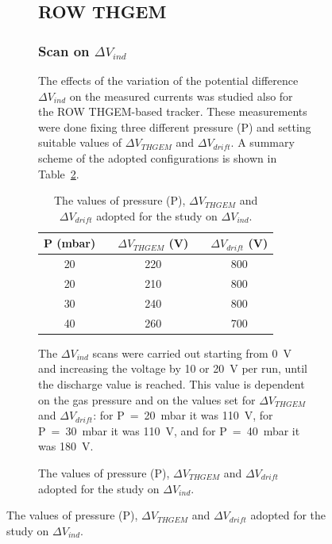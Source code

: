 \documentclass[a4paper, 11 pt]{article}
\newcommand{\Vind}{$\Delta V_{ind}$}
\newcommand{\Vthgem}{$\Delta V_{THGEM}$}
\newcommand{\Vdrift}{$ \Delta V_{drift}$}
\begin{document}
\begin{figure}[htbp]
\begin{figure}[htbp]
\clearpage

\subsection{ROW THGEM}

\subsubsection{Scan on \Vind}




The effects of the variation of the potential difference \Vind{} on the measured currents was studied also for the ROW THGEM-based tracker.
These measurements were done fixing three different pressure (P) and setting suitable values of \Vthgem{} and \Vdrift.
A summary scheme of the adopted configurations is shown in Table~\ref{tab:ROWTHGEM_vind}.
\begin{table} [htbp]
	\begin{center}
		\renewcommand{\arraystretch}{1.2}
		\begin{tabular} {ccccc}
			P (mbar) & & \Vthgem{} (V) & & \Vdrift{} (V)\\
			\toprule[0.1em]
			20	& &	220	& &	800 \\
			20	& & 210	& & 800 \\
			30	& &	240	& &	800 \\
			40	& &	260	& &	700 \\
			
			\bottomrule[0.1em]
		\end{tabular}
	\end{center}
	\caption{The values of pressure (P), \Vthgem{} and \Vdrift{} adopted for the study on \Vind.} \label{tab:ROWTHGEM_vind}
\end{table}
The \Vind{} scans were carried out starting from 0~V and increasing the voltage by 10 or 20~V per run, until the discharge value is reached.
This value is dependent on the gas pressure and on the values set for \Vthgem{} and \Vdrift: for P~=~20~mbar it was 110~V, for P~=~30~mbar it was 110~V, and for P~=~40~mbar it was 180~V.





\end{figure}
\end{figure}
\end{document}
